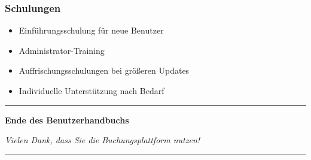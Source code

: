 \subsubsection{Schulungen}

\begin{itemize}
    \item Einführungsschulung für neue Benutzer
    \item Administrator-Training
    \item Auffrischungsschulungen bei größeren Updates
    \item Individuelle Unterstützung nach Bedarf
\end{itemize}

\vfill

\begin{center}
    \rule{0.8\textwidth}{0.4pt}
    
    \textbf{Ende des Benutzerhandbuchs}
    
    \textit{Vielen Dank, dass Sie die Buchungsplattform nutzen!}
    
    \rule{0.8\textwidth}{0.4pt}
\end{center}

\newpage